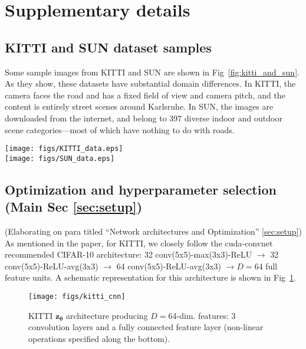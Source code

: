 \documentclass[10pt,twocolumn,letterpaper]{article}
\begin{document}
\section{Supplementary details}\subsection{KITTI and SUN dataset samples}
Some sample images from KITTI and SUN are shown in Fig~\ref{fig:kitti_and_sun}. As they show, these datasets have substantial domain differences. In KITTI, the camera faces the road and has a fixed field of view and camera pitch, and the content is entirely street scenes around Karlsruhe.  In SUN, the images are downloaded from the internet, and belong to 397 diverse indoor and outdoor scene categories---most of which have nothing to do with roads.
\begin{figure*}[t]
 \centering
  \texttt{[image: figs/KITTI\_data.eps]}
%
%
%
%
  \\
  \texttt{[image: figs/SUN\_data.eps]}
%
  \caption{(top) Figure from~\cite{kitti} showcasing images from the 4 KITTI location classes (shown here in color; we use grayscale images), and (bottom) Figure from~\cite{sun} showcasing images from a subset of the 397 SUN classes (shown here in color; see text in main paper for image pre-processing details).}
  \label{fig:kitti_and_sun}
\end{figure*}\subsection{Optimization and hyperparameter selection (Main Sec \ref{sec:setup})}
(Elaborating on para titled ``Network architectures and Optimization'' \ref{sec:setup})
As mentioned in the paper, for KITTI, we closely follow the cuda-convnet~\cite{cuda-convnet} recommended CIFAR-10 architecture: 32 conv(5x5)-max(3x3)-ReLU $\rightarrow$ 32 conv(5x5)-ReLU-avg(3x3) $\rightarrow$ 64 conv(5x5)-ReLU-avg(3x3) $\rightarrow$$D=$64 full feature units. A schematic representation for this architecture is shown in Fig~\ref{fig:kitti_net}.

\begin{figure}
  \centering
  \texttt{[image: figs/kitti\_cnn]}
  \caption{{KITTI $\mathbf{z_{\bm{\theta}}}$ architecture producing $D=$64-dim. features: 3 convolution layers and a fully connected feature layer (non-linear operations specified along the bottom).}}
  \vspace{-0.1in}
  \label{fig:kitti_net}
\end{figure}
\end{document}
